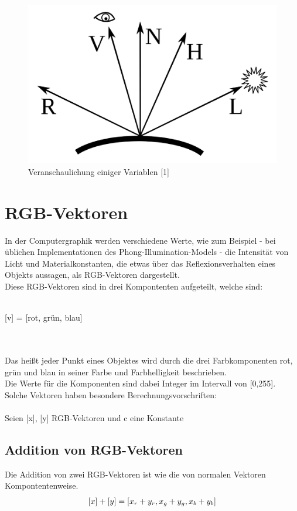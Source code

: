 \documentclass[a4paper]{scrartcl}%
\begin{document}
    \begin{figure}[H]
        \centering
        \includegraphics[scale=0.3]{./possible-images/Diagram.png}
        \caption{Veranschaulichung einiger Variablen [1]}
        \label{fig:./possible-images/Diagram}
    \end{figure}


\section{RGB-Vektoren}%
\label{sec:rgb_vektoren}
    In der Computergraphik werden verschiedene Werte, wie zum Beispiel - bei üblichen Implementationen des Phong-Illumination-Models -
    die Intensität von Licht und Materialkonstanten, die etwas über das Reflexionsverhalten eines Objekts aussagen, als RGB-Vektoren dargestellt.\\
    Diese RGB-Vektoren sind in drei Kompontenten aufgeteilt, welche sind:\\
    \\\centerline{[v] = [rot, grün, blau]}\\
    \\Das heißt jeder Punkt eines Objektes wird durch die drei Farbkomponenten rot, grün und blau in seiner Farbe und Farbhelligkeit beschrieben.\\
    Die Werte für die Komponenten sind dabei Integer im Intervall von [0,255].\\
    Solche Vektoren haben besondere Berechnungsvorschriften:\\
    \\Seien [x], [y] RGB-Vektoren und c eine Konstante
    
    \subsection{Addition von RGB-Vektoren}%
    \label{sub:addition_zweier_rgb_vektoren}
        Die Addition von zwei RGB-Vektoren ist wie die von normalen Vektoren Kompontentenweise.\\
        \begin{equation}
            \label{eq:rgb-add}
            [x] + [y] =  [x_r + y_r, x_g + y_g, x_b + y_b]\\
        \end{equation}
     
\end{document}
